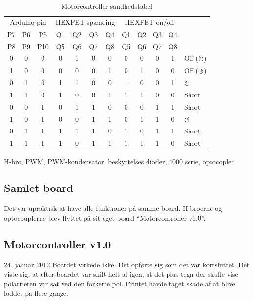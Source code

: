 \documentclass[a4paper,twoside,article,danish,table]{memoir}
\newcommand{\boarddate}[1]{\textcolor{blue!80!black}{#1}}
\begin{document}
\begin{table}[htbp]
  \caption{Motorcontroller sandhedstabel}
  \centering
  \begin{tabular}{ccc|cccc|ccccl}
    \toprule
    \multicolumn{3}{c}{Arduino pin}&\multicolumn{4}{c}{HEXFET spænding}&\multicolumn{4}{c}{HEXFET on/off}\\
    P7&P6&P5 &Q1&Q2&Q3&Q4 &Q1&Q2&Q3&Q4\\
    P8&P9&P10 &Q5&Q6&Q7&Q8 &Q5&Q6&Q7&Q8\\
    \midrule
    0&0&0 &0&1&0&0 &0&0&0&1 & Off ($\circlearrowright$)\\
    1&0&0 &0&0&0&1 &0&1&0&0 & Off ($\circlearrowleft$)\\
    0&1&0 &1&1&0&0 &1&0&0&1 & $\circlearrowright$\\
    1&1&0 &1&0&0&1 &1&1&0&0 & Short\\
    0&0&1 &0&1&1&0 &0&0&1&1 & Short\\
    1&0&1 &0&0&1&1 &0&1&1&0 & $\circlearrowleft$\\
    0&1&1 &1&1&1&0 &1&0&1&1 & Short\\
    1&1&1 &1&0&1&1 &1&1&1&0 & Short\\
    \bottomrule
  \end{tabular}
  \label{tab:sandhed}
\end{table}

H-bro, PWM, PWM-kondensator, beskyttelses dioder, 4000 serie, optocopler

\subsection{Samlet board}
Det var upraktisk at have alle funktioner på samme board. H-broerne og optocouplerne blev flyttet på sit eget board “Motorcontroller v1.0”.

\subsection{Motorcontroller v1.0}
\boarddate{24. januar 2012}
Boardet virkede ikke. Det opførte sig som det var kortsluttet. Det viste sig, at efter boardet var skilt helt af igen, at det plus tegn der skulle vise polariteten var sat ved den forkerte pol. Printet havde taget skade af at blive loddet på flere gange.
\end{document}
